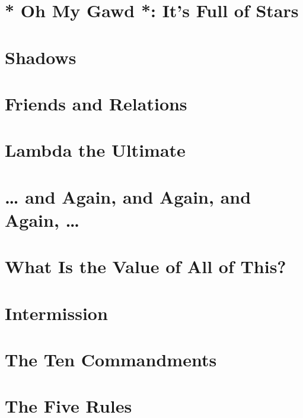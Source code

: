 \documentclass[11pt]{article}
\begin{document}
\section{* Oh My Gawd *: It's Full of Stars}
\label{sec:org49c718b}

\section{Shadows}
\label{sec:org5b66913}

\section{Friends and Relations}
\label{sec:orga8e4437}

\section{Lambda the Ultimate}
\label{sec:orgd8fc301}

\section{\ldots{} and Again, and Again, and Again, \ldots{}}
\label{sec:org1e465b4}

\section{What Is the Value of All of This?}
\label{sec:org52fd5cf}

\section{Intermission}
\label{sec:orgb53c9b2}

\section{The Ten Commandments}
\label{sec:orgaad588e}

\section{The Five Rules}
\label{sec:org5542ef1}
\end{document}
